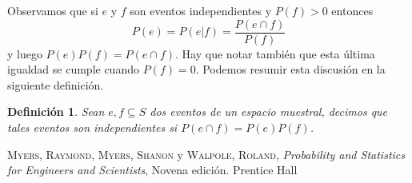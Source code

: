 \documentclass[spanish]{report}
\newtheorem{defi}[thm]{Definición}
\begin{document}
Observamos que si $e$ y $f$ son eventos independientes y $P(f) > 0$ entonces
\[P(e) = P(e|f) = \dfrac{P(e \cap f)}{P(f)}\]
y luego $P(e)P(f) = P(e \cap f)$.
Hay que notar también que esta última igualdad se cumple cuando $P(f)=0$.
Podemos resumir esta discusión en la siguiente definición.

\begin{defi}
	Sean $e, f \subseteq S$ dos eventos de un espacio muestral, decimos que tales eventos son independientes si $P(e \cap f) = P(e) P(f)$.
\end{defi}

\begin{thebibliography}{}
 \textsc{Myers, Raymond}, \textsc{Myers, Shanon} y \textsc{Walpole, Roland}, \textit{Probability and Statistics for Engineers and Scientists}, Novena edición. Prentice Hall
\end{thebibliography}
\end{document}
